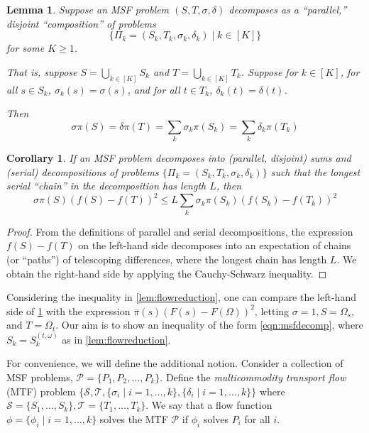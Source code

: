 \documentclass[a4paper, 12p]{article}
\numberwithin{equation}{section}
\newcommand{\FF}{F}
\newcommand{\piproj}{\overline{\pi}}
\newtheorem{lemma}[theorem]{Lemma}
\newtheorem{corollary}[theorem]{Corollary}
\begin{document}
\begin{lemma}
Suppose an MSF problem $(S, T, \sigma, \delta)$ decomposes as a ``parallel,'' disjoint ``composition'' of problems
\[
\{\Pi_k = (S_k, T_k, \sigma_k, \delta_k) \mid k \in [K]\}
\]
for some $K \geq 1$.

That is, suppose $S = \bigcup_{k \in [K]} S_k$ and $T = \bigcup_{k \in [K]} T_k$. Suppose for $k \in [K]$, for all $s \in S_k$, $\sigma_k(s) = \sigma(s)$, and for all $t \in T_k$, $\delta_k(t) = \delta(t)$.

Then 
\[\sigma \pi(S) = \delta\pi(T) = \sum_k \sigma_k\pi(S_k) = \sum_k \delta_k \pi(T_k)\]
\end{lemma}

\begin{corollary}
If an MSF problem decomposes into (parallel, disjoint) sums and (serial) decompositions of problems $\{\Pi_k = (S_k, T_k, \sigma_k, \delta_k)\}$ such that the longest serial ``chain'' in the decomposition has length $L$, then 
\begin{equation}
    \sigma \pi(S)(f(S) - f(T))^2 \leq L\sum_k\sigma_k\pi(S_k)(f(S_k) - f(T_k))^2 \label{eqn:msfdecomp}
\end{equation}
\label{cor:msfdecomp}
\end{corollary}
\begin{proof}
    From the definitions of parallel and serial decompositions, the expression $f(S) - f(T)$ on the left-hand side decomposes into an expectation of chains (or ``paths'') of telescoping differences, where the longest chain has length $L$. We obtain the right-hand side by applying the Cauchy-Schwarz inequality.
\end{proof}

Considering the inequality in \cref{lem:flowreduction}, one can compare the left-hand side of \cref{cor:msfdecomp} with the expression $\piproj(s)(\FF(s) - \FF(\Omega))^2$, letting $\sigma = 1, S = \Omega_s$, and $T = \Omega_t$. Our aim is to show an inequality of the form \eqref{eqn:msfdecomp}, where $S_k = S_k^{(t, \omega)}$ as in \cref{lem:flowreduction}.

For convenience, we will define the additional notion. Consider a collection of MSF problems, $\mathcal{P} = \{P_1, P_2, \dots, P_k\}$. Define the \emph{multicommodity transport flow} (MTF) problem  $\{\mathcal{S}, \mathcal{T}, \{\sigma_i \mid i = 1,\dots, k\}, \{\delta_i \mid i = 1, \dots, k\}\}$ where $\mathcal{S} = \{S_1, \dots, S_k\}, \mathcal{T} = \{T_1, \dots, T_k\}$. We say that a flow function $\phi = \{\phi_i \mid i = 1, \dots, k\}$ solves the MTF $\mathcal{P}$ if $\phi_i$ solves $P_i$ for all $i$.
\end{document}
